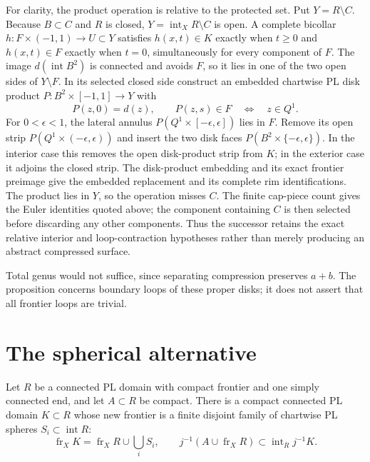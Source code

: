 For clarity, the product operation is relative to the protected set. Put
$Y=R\setminus C$. Because $B\subset C$ and $R$ is closed,
$Y=\operatorname{int}_X R\setminus C$ is open. A complete bicollar
$h:F\times(-1,1)\to U\subset Y$ satisfies
$h(x,t)\in K$ exactly when $t\geq0$ and $h(x,t)\in F$ exactly when
$t=0$, simultaneously for every component of $F$. The image
$d(\operatorname{int}B^2)$ is connected and avoids $F$, so it lies in one
of the two open sides of $Y\setminus F$.
In its selected closed side construct an embedded chartwise PL disk product
$P:B^2\times[-1,1]\to Y$ with
\[
 P(z,0)=d(z),\qquad P(z,s)\in F\quad\Longleftrightarrow\quad z\in Q^1.
\]
For $0<\epsilon<1$, the lateral annulus
$P(Q^1\times[-\epsilon,\epsilon])$ lies in $F$. Remove its open strip
$P(Q^1\times(-\epsilon,\epsilon))$ and insert the two disk faces
$P(B^2\times\{-\epsilon,\epsilon\})$. In the interior case this removes
the open disk-product strip from $K$; in the exterior case it adjoins the
closed strip. The disk-product embedding and its exact frontier preimage
give the embedded replacement and its complete rim identifications.
The product lies in $Y$, so the operation misses $C$. The finite cap-piece
count gives the Euler identities quoted above; the component containing $C$ is then
selected before discarding any other components. Thus the successor retains
the exact relative interior and loop-contraction hypotheses rather than
merely producing an abstract compressed surface.

Total genus would not suffice, since separating compression preserves
$a+b$. The proposition concerns boundary loops of these proper disks;
it does not assert that all frontier loops are trivial.

\section{The spherical alternative}
\label{sec:spherical-frontier}

\begin{theorem}
\label{thm:compact-spherical-frontier}
Let $R$ be a connected PL domain with compact frontier and one simply
connected end, and let $A\subset R$ be compact. There is a compact
connected PL domain $K\subset R$ whose new frontier is a finite disjoint
family of chartwise PL spheres $S_i\subset\operatorname{int}R$:
\[
 \operatorname{fr}_X K=\operatorname{fr}_X R\cup\bigcup_i S_i,
 \qquad j^{-1}(A\cup\operatorname{fr}_X R)
 \subset\operatorname{int}_R j^{-1}K.
\]
\end{theorem}

